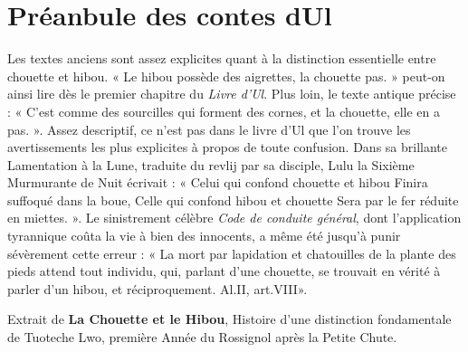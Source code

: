 \chapter{Préanbule des contes d\textquotesingle{}Ul}
\hypertarget{md__2home_2solype_2delivery_2current__days_2Mannheim_2back_2server_2public_2lore_2preambule}{}\label{md__2home_2solype_2delivery_2current__days_2Mannheim_2back_2server_2public_2lore_2preambule}
\label{md__2home_2solype_2delivery_2current__days_2Mannheim_2back_2server_2public_2lore_2preambule_autotoc_md0}%
%
 Les textes anciens sont assez explicites quant à la distinction essentielle entre chouette et hibou. « Le hibou possède des aigrettes, la chouette pas. » peut-\/on ainsi lire dès le premier chapitre du {\itshape Livre d’\+Ul}. Plus loin, le texte antique précise \+: « C’est comme des sourcilles qui forment des cornes, et la chouette, elle en a pas. ». Assez descriptif, ce n’est pas dans le livre d’\+Ul que l’on trouve les avertissements les plus explicites à propos de toute confusion. Dans sa brillante Lamentation à la Lune, traduite du revlij par sa disciple, Lulu la Sixième Murmurante de Nuit écrivait \+: « Celui qui confond chouette et hibou Finira suffoqué dans la boue, Celle qui confond hibou et chouette Sera par le fer réduite en miettes. ». Le sinistrement célèbre {\itshape Code de conduite général}, dont l’application tyrannique coûta la vie à bien des innocents, a même été jusqu’à punir sévèrement cette erreur \+: « La mort par lapidation et chatouilles de la plante des pieds attend tout individu, qui, parlant d’une chouette, se trouvait en vérité à parler d’un hibou, et réciproquement. Al.\+II, art.\+VIII».

Extrait de {\bfseries{La Chouette et le Hibou}}, Histoire d’une distinction fondamentale de Tuoteche Lwo, première Année du Rossignol après la Petite Chute. 